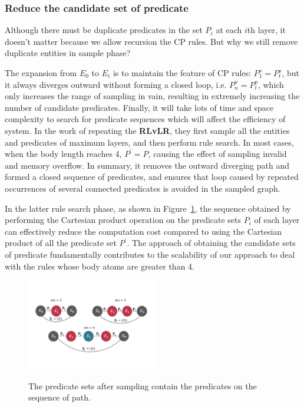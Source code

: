 \documentclass{article}
\begin{document}
	\subsubsection{Reduce the candidate set of predicate }
	Although there must be duplicate predicates in the set $P_i$ at each $i$th layer, it doesn't matter because we allow recursion the CP rules. But why we still remove duplicate entities in sample phase?
	
	The expansion from $E_0$ to $E_i$ is to maintain the feature of CP rules: $P_1^s = P_t^s$, but it always diverges outward without forming a closed loop, i.e. $P_n^o = P_t^o$, which only increases the range of sampling in vain, resulting in extremely increasing the number of candidate predicates. Finally, it will take lots of time and space complexity to search for predicate sequences which will affect the efficiency of system. In the work of repeating the {\bf RLvLR}, they first sample all the entities and predicates of maximum layers, and then perform rule search. In most cases, when the body length reaches 4, $P^{'}=P$, causing the effect of sampling invalid and memory overflow. 
	In summary, it removes the outward diverging path and formed a closed sequence of predicates, and ensures that  loop caused by repeated occurrences of several connected predicates is avoided in the sampled graph.
	
	In the latter rule search phase, as shown in Figure~\ref{fig:rule}, the sequence obtained by performing the Cartesian product operation on the predicate sets $P_i$ of each layer can effectively reduce the computation cost compared to using the Cartesian product of all the predicate set $P^{'}$. 
	The approach of obtaining the candidate sets of predicate fundamentally contributes to the scalability of our approach to deal with the rules whose body atoms are greater than 4. 

	\begin{figure}
		\centering
		\includegraphics[height=40mm]{rule.pdf}\\
		\caption{The predicate sets after sampling contain the predicates on the sequence of path.}
		\label{fig:rule}
	\end{figure}
	
\end{document}
